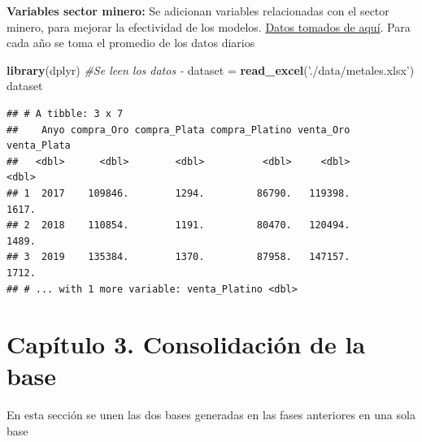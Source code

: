 \documentclass[
  11pt,
  a4paper,
]{book}
\newenvironment{Shaded}{\begin{snugshade}}{\end{snugshade}}
\newcommand{\CommentTok}[1]{\textcolor[rgb]{0.56,0.35,0.01}{\textit{#1}}}
\newcommand{\DataTypeTok}[1]{\textcolor[rgb]{0.13,0.29,0.53}{#1}}
\newcommand{\KeywordTok}[1]{\textcolor[rgb]{0.13,0.29,0.53}{\textbf{#1}}}
\newcommand{\NormalTok}[1]{#1}
\newcommand{\OperatorTok}[1]{\textcolor[rgb]{0.81,0.36,0.00}{\textbf{#1}}}
\newcommand{\StringTok}[1]{\textcolor[rgb]{0.31,0.60,0.02}{#1}}
\begin{document}
\textbf{Variables sector minero:} Se adicionan variables relacionadas
con el sector minero, para mejorar la efectividad de los modelos.
\href{https://www.banrep.gov.co/es/estadisticas/precios-del-dia-para-el-gramo-oro-plata-y-platino}{Datos
tomados de aquí}. Para cada año se toma el promedio de los datos diarios

\begin{Shaded}
\begin{Highlighting}[]
\KeywordTok{library}\NormalTok{(dplyr)}
\CommentTok{#Se leen los datos -  }
\NormalTok{dataset =}\StringTok{ }\KeywordTok{read_excel}\NormalTok{(}\StringTok{'./data/metales.xlsx'}\NormalTok{)}
\NormalTok{dataset}
\end{Highlighting}
\end{Shaded}

\begin{verbatim}
## # A tibble: 3 x 7
##    Anyo compra_Oro compra_Plata compra_Platino venta_Oro venta_Plata
##   <dbl>      <dbl>        <dbl>          <dbl>     <dbl>       <dbl>
## 1  2017    109846.        1294.         86790.   119398.       1617.
## 2  2018    110854.        1191.         80470.   120494.       1489.
## 3  2019    135384.        1370.         87958.   147157.       1712.
## # ... with 1 more variable: venta_Platino <dbl>
\end{verbatim}

\begin{Shaded}
\end{Shaded}

\hypertarget{capuxedtulo-3.-consolidaciuxf3n-de-la-base}{%
\chapter{Capítulo 3. Consolidación de la
base}\label{capuxedtulo-3.-consolidaciuxf3n-de-la-base}}

En esta sección se unen las dos bases generadas en las fases anteriores
en una sola base
\end{document}
